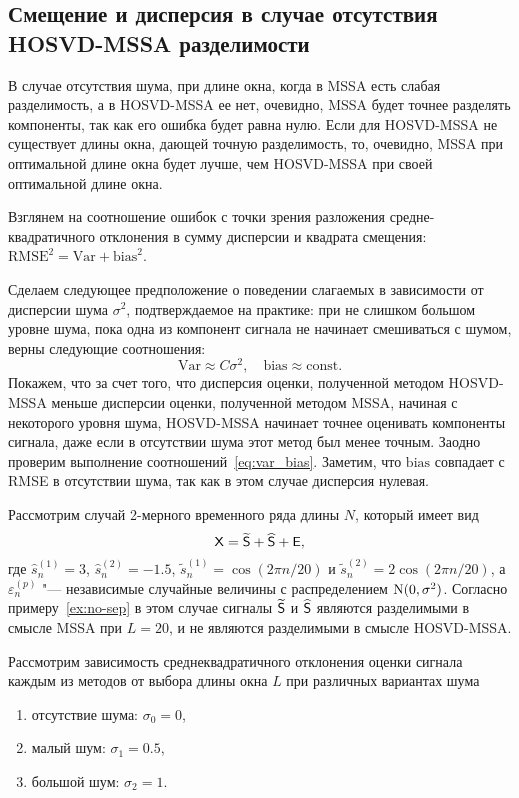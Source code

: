 \documentclass[specialist,
  substylefile=spbu.rtx,
subf,href,colorlinks=true, 12pt]{disser}
\theoremstyle{plain}
\theoremstyle{definition}
\theoremstyle{remark}
\begin{document}
\subsection{Смещение и дисперсия в случае отсутствия HOSVD-MSSA разделимости}
В случае отсутствия шума, при длине окна, когда в MSSA есть слабая разделимость, а в HOSVD-MSSA ее нет,
очевидно, MSSA будет точнее разделять компоненты, так как его ошибка будет равна нулю.
Если для HOSVD-MSSA не существует длины окна, дающей точную разделимость, то, очевидно, MSSA при оптимальной длине
окна будет лучше, чем HOSVD-MSSA при своей оптимальной длине окна.

Взглянем на соотношение ошибок с точки зрения разложения средне-квадратичного отклонения в сумму дисперсии и квадрата смещения: $\mathrm{RMSE}^2 = \mathrm{Var} + \mathrm{bias}^2$.

Сделаем следующее предположение о поведении слагаемых в зависимости от дисперсии шума $\sigma^2$, подтверждаемое на практике: при не слишком большом уровне шума, пока одна из компонент сигнала не начинает смешиваться с шумом, верны следующие соотношения:
\begin{equation}
  \label{eq:var_bias}
  \mathrm{Var} \approx C\sigma^2, \quad \mathrm{bias} \approx \mathrm{const}.
\end{equation}
Покажем, что за счет того, что дисперсия оценки, полученной методом HOSVD-MSSA меньше дисперсии оценки,
полученной методом MSSA, начиная с некоторого уровня шума, HOSVD-MSSA начинает точнее оценивать компоненты сигнала,
даже если в отсутствии шума этот метод был менее точным.
Заодно проверим выполнение соотношений~\eqref{eq:var_bias}.
Заметим, что $\mathrm{bias}$ совпадает с RMSE в отсутствии шума, так как в этом случае дисперсия нулевая.

Рассмотрим случай 2-мерного временного ряда длины $N$, который имеет вид
\[
  \mathsf{X} = \widetilde{\mathsf{S}} + \widehat{\mathsf{S}} + \mathsf{E},
\]
где $\hat{s}_n^{(1)} = 3$, $\hat{s}_n^{(2)} = -1.5$,
$\tilde{s}_n^{(1)} = \cos(2\pi n / 20)$ и $\tilde{s}_n^{(2)} = 2\cos(2\pi n / 20)$,
а $\varepsilon_n^{(p)}$ "--- независимые случайные величины
с распределением $\mathrm{N}(0, \sigma^2)$.
Согласно примеру~\ref{ex:no-sep} в этом случае сигналы $\widetilde{\mathsf{S}}$ и $\widehat{\mathsf{S}}$ являются
разделимыми в смысле MSSA при $L=20$, и не являются разделимыми в смысле HOSVD-MSSA.

Рассмотрим зависимость среднеквадратичного отклонения оценки сигнала каждым из методов от выбора длины окна
$L$ при различных вариантах шума
\begin{enumerate}
  \item отсутствие шума: $\sigma_0 = 0$,
  \item малый шум: $\sigma_1 = 0.5$,
  \item большой шум: $\sigma_2 = 1$.
\end{enumerate}
\end{document}
